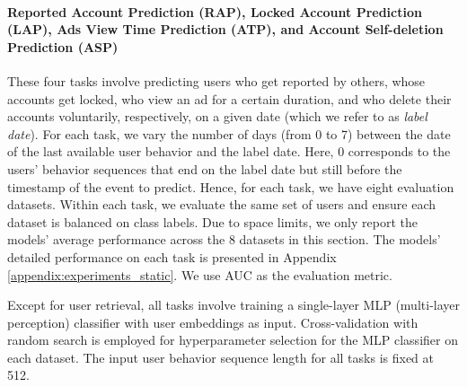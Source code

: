 \documentclass{article}
\begin{document}
\paragraph{Reported Account Prediction (RAP), Locked Account Prediction (LAP), Ads View Time Prediction (ATP), and Account Self-deletion Prediction (ASP)}
These four tasks involve predicting users who get reported by others, whose accounts get locked, who view an ad for a certain duration, and who delete their accounts voluntarily, respectively, on a given date (which we refer to as \textit{label date}). For each task, we vary the number of days (from 0 to 7) between the date of the last available user behavior and the label date. Here, $0$  corresponds to the users' behavior sequences that end on the label date but still before the timestamp of the event to predict.  Hence, for each task, we have eight evaluation datasets. Within each task, we evaluate the same set of users and ensure each dataset is balanced on class labels. Due to space limits, we only report the models' average performance across the 8 datasets in this section. The models' detailed performance on each task is presented in Appendix \ref{appendix:experiments_static}. We use AUC as the evaluation metric.

Except for user retrieval, all tasks involve training a single-layer MLP (multi-layer perception) classifier with user embeddings as input. Cross-validation with random search is employed for hyperparameter selection for the MLP classifier on each dataset. The input user behavior sequence length for all tasks is fixed at 512.
\end{document}
